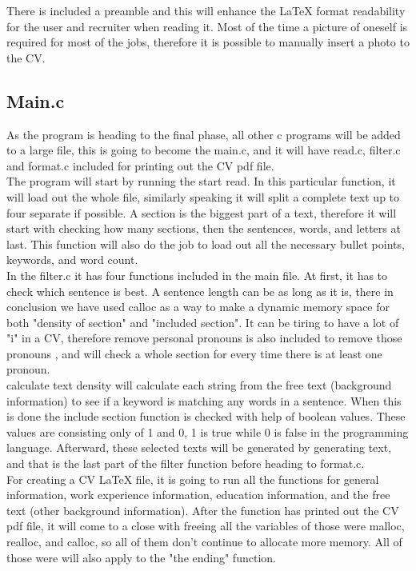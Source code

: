 There is included a preamble and this will enhance the LaTeX format readability for the user and recruiter when reading it. 
Most of the time a picture of oneself is required for most of the jobs, therefore it is possible to manually insert a photo to the CV. 

\subsection{Main.c}
As the program is heading to the final phase, all other c programs will be added to a large file, 
this is going to become the main.c, and it will have read.c, filter.c and format.c included for printing out the CV pdf file. \\

The program will start by running the start read. In this particular function, it will load out the whole file, 
similarly speaking it will split a complete text up to four separate if possible. A section is the biggest part of a text, 
therefore it will start with checking how many sections, then the sentences, words, and letters at last.
This function will also do the job to load out all the necessary bullet points, keywords, and word count. \\

In the filter.c it has four functions included in the main file.
At first, it has to check which sentence is best. A sentence length can be as long as it is, 
there in conclusion we have used calloc as a way to make a dynamic memory space for both "density of section" and "included section".
It can be tiring to have a lot of "i" in a CV, therefore remove personal pronouns is also included to remove those pronouns
, and will check a whole section for every time there is at least one pronoun. \\

calculate text density will calculate each string from the free text (background information) to see
if a keyword is matching any words in a sentence.
When this is done the include section function is checked with help of boolean values.
These values are consisting only of 1 and 0, 1 is true while 0 is false in the programming language.
Afterward, these selected texts will be generated by generating text, 
and that is the last part of the filter function before heading to format.c. \\

For creating a CV LaTeX file, it is going to run all the functions for general information, work experience information, 
education information, and the free text (other background information). After the function has printed out the CV pdf file,
it will come to a close with freeing all the variables of those were malloc, realloc, and calloc, 
so all of them don't continue to allocate more memory. All of those were will also apply to the "the ending" function.


